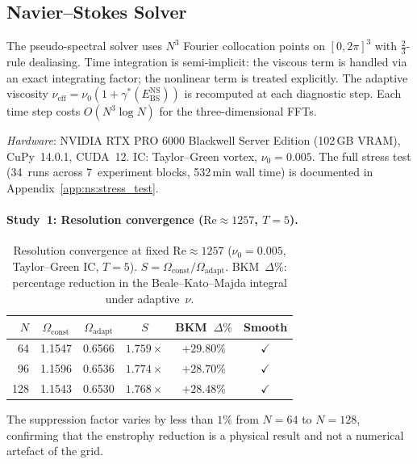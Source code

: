\documentclass[final]{siamltex}
\newcommand{\Ebs}{E_{\mathrm{BS}}}
\begin{document}
\begin{appendix}
\subsection{Navier--Stokes Solver}

The pseudo-spectral solver uses $N^3$ Fourier collocation points
on $[0,2\pi]^3$ with $\tfrac{2}{3}$-rule dealiasing.  Time
integration is semi-implicit: the viscous term is handled via an
exact integrating factor; the nonlinear term is treated explicitly.
The adaptive viscosity
$\nu_{\mathrm{eff}}=\nu_0(1+\gamma^*(\Ebs^{\mathrm{NS}}))$
is recomputed at each diagnostic step.  Each time step costs
$O(N^3\log N)$ for the three-dimensional FFTs.

\textit{Hardware}: NVIDIA RTX PRO 6000 Blackwell Server Edition
(102\,GB VRAM), CuPy~14.0.1,
CUDA~12.  IC: Taylor--Green vortex, $\nu_0=0.005$.
The full stress test (34~runs across 7~experiment blocks,
532\,min wall time) is documented in
Appendix~\ref{app:ns:stress_test}.

\paragraph{Study~1: Resolution convergence
  ($\mathrm{Re}\approx 1257$, $T=5$).}

\begin{table}[htbp]
\centering
\caption{Resolution convergence at fixed $\mathrm{Re}\approx 1257$
  ($\nu_0=0.005$, Taylor--Green IC, $T=5$).
  $S = \Omega_{\text{const}}/\Omega_{\text{adapt}}$.
  BKM~$\Delta\%$: percentage reduction in the
  Beale--Kato--Majda integral under adaptive~$\nu$.}
\label{tab:ns_convergence}
\begin{tabular}{@{}rccccc@{}}
\toprule
$N$ & $\Omega_{\text{const}}$ & $\Omega_{\text{adapt}}$
    & $S$ & BKM~$\Delta\%$ & Smooth\\
\midrule
 64 & 1.1547 & 0.6566 & $1.759\times$ & $+29.80\%$ & $\checkmark$\\
 96 & 1.1596 & 0.6536 & $1.774\times$ & $+28.70\%$ & $\checkmark$\\
128 & 1.1543 & 0.6530 & $1.768\times$ & $+28.48\%$ & $\checkmark$\\
\bottomrule
\end{tabular}
\end{table}

The suppression factor varies by less than $1\%$ from $N=64$ to
$N=128$, confirming that the enstrophy reduction is a physical
result and not a numerical artefact of the grid.


\end{appendix}
\end{document}
